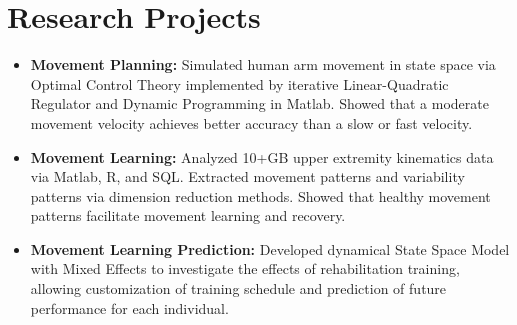 \documentclass[hidelinks,letterpaper,11pt]{article}
\newcommand{\resumeItem}[2]{
  \item{
    \textbf{#1: }{\small #2 \vspace{-2pt}}
  }
}
\newcommand{\resumeSubHeadingListStart}{\begin{itemize}[leftmargin=*]}
\newcommand{\resumeSubHeadingListEnd}{\end{itemize}}
\begin{document}
\section{Research Projects}
  \resumeSubHeadingListStart 
    \resumeItem{Movement Planning}
      {Simulated human arm movement in state space via Optimal Control Theory implemented by iterative Linear-Quadratic Regulator and {Dynamic Programming} in Matlab. Showed that a moderate movement velocity achieves better accuracy than a slow or fast velocity.}
    \resumeItem{Movement Learning}
      {Analyzed 10+GB upper extremity kinematics data via Matlab, R, and SQL. Extracted movement patterns and variability patterns via dimension reduction methods. Showed that healthy movement patterns facilitate movement learning and recovery. }
    \resumeItem{Movement Learning Prediction}
      {Developed dynamical {State Space Model with Mixed Effects} to investigate the effects of rehabilitation training, allowing customization of training schedule and prediction of future performance for each individual.}


  \resumeSubHeadingListEnd








\end{document}
